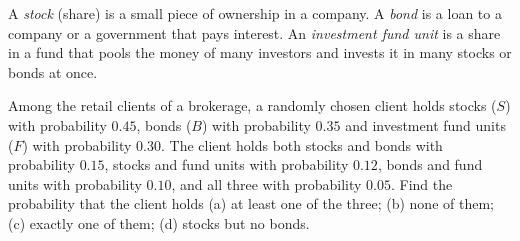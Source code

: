 
\begin{problem}
	\begin{context}
		A \emph{stock} (share) is a small piece of ownership in a company. A
		\emph{bond} is a loan to a company or a government that pays interest. An
		\emph{investment fund unit} is a share in a fund that pools the money of
		many investors and invests it in many stocks or bonds at once.
	\end{context}
	Among the retail clients of a brokerage, a randomly chosen client holds
	stocks ($S$) with probability $0.45$, bonds ($B$) with probability $0.35$
	and investment fund units ($F$) with probability $0.30$. The client holds
	both stocks and bonds with probability $0.15$, stocks and fund units with
	probability $0.12$, bonds and fund units with probability $0.10$, and all
	three with probability $0.05$. Find the probability that the client holds
	(a) at least one of the three; (b) none of them; (c) exactly one of them;
	(d) stocks but no bonds.
\end{problem}

